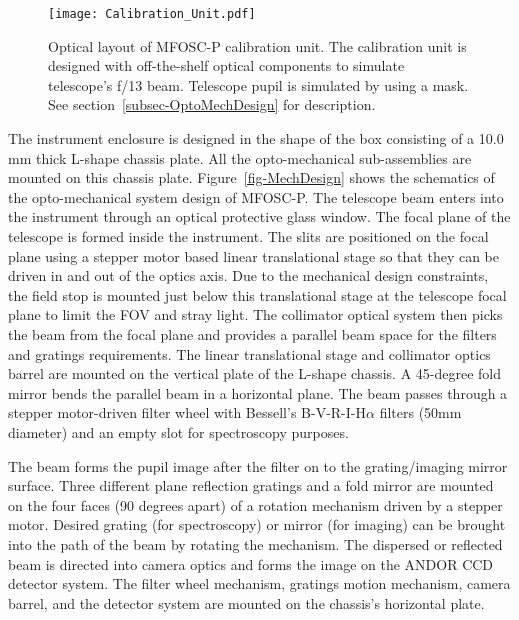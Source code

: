 \begin{figure}
	\centering
	\texttt{[image: Calibration\_Unit.pdf]}
	\vspace{0.2cm}
	\caption{Optical layout of MFOSC-P calibration unit. The calibration unit is designed with off-the-shelf optical components to simulate telescope's f/13 beam. Telescope pupil is simulated by using a mask. See section~\ref{subsec-OptoMechDesign} for description.}
	\label{fig-CalibUnit}
\end{figure}


\par 
The instrument enclosure is designed in the shape of the box consisting of a 10.0 mm thick L-shape chassis plate. All the opto-mechanical sub-assemblies are mounted on this chassis plate. Figure~\ref{fig-MechDesign} shows the schematics of the opto-mechanical system design of MFOSC-P.  The telescope beam enters into the instrument through an optical protective glass window. The focal plane of the telescope is formed inside the instrument. The slits are positioned on the focal plane using a stepper motor based linear translational stage so that they can be driven in and out of the optics axis. Due to the mechanical design constraints, the field stop is mounted just below this translational stage at the telescope focal plane to limit the FOV and stray light. The collimator optical system then picks the beam from the focal plane and provides a parallel beam space for the filters and gratings requirements. The linear translational stage and collimator optics barrel are mounted on the vertical plate of the L-shape chassis. A 45-degree fold mirror bends the parallel beam in a horizontal plane. The beam passes through a stepper motor-driven filter wheel with Bessell’s B-V-R-I-H$\alpha$ filters (50mm diameter) and an empty slot for spectroscopy purposes. 
\par 
The beam forms the pupil image after the filter on to the grating/imaging mirror surface.  Three different plane reflection gratings and a fold mirror are mounted on the four faces (90 degrees apart) of a rotation mechanism driven by a stepper motor. Desired grating (for spectroscopy) or mirror (for imaging) can be brought into the path of the beam by rotating the mechanism. The dispersed or reflected beam is directed into camera optics and forms the image on the ANDOR CCD detector system. The filter wheel mechanism, gratings motion mechanism, camera barrel, and the detector system are mounted on the chassis's horizontal plate. 
\par 
